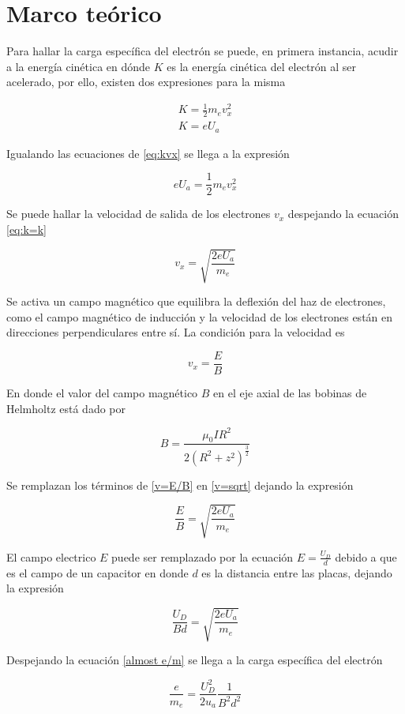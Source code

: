 \section{Marco teórico}

Para hallar la carga específica del electrón se puede, en primera instancia, acudir a la energía cinética  en dónde $K$ es la energía cinética del electrón al ser acelerado, por ello, existen dos expresiones para la misma

\begin{equation}\label{eq:kvx}
    \begin{split}
        K=\frac{1}{2}m_ev_x^2\\
        K=eU_a
    \end{split}
 \end{equation}

Igualando las ecuaciones de \ref{eq:kvx} se llega a la expresión

\begin{equation}\label{eq:k=k}
    eU_a=\frac{1}{2}m_ev_x^2
\end{equation}

Se puede hallar la velocidad de salida de los electrones $v_x$ despejando la ecuación \ref{eq:k=k}

\begin{equation}\label{v=sqrt}
    v_x=\sqrt{\frac{2eU_a}{m_e}}
\end{equation}

Se activa un campo magnético que equilibra la deflexión del haz de electrones, como el campo magnético de inducción  y la velocidad de los electrones están en direcciones perpendiculares entre sí. La condición para la velocidad es 

\begin{equation}\label{v=E/B}
    v_x=\frac{E}{B}
\end{equation}

En donde el valor del campo magnético $B$ en el eje axial  de las bobinas de Helmholtz está dado por \cite{papadopoulos-1963}

\begin{equation}
    B=\frac{\mu_0IR^2}{2(R^2+z^2)^{\frac{3}{2}}}
\end{equation}


Se remplazan los términos de \ref{v=E/B} en \ref{v=sqrt} dejando la expresión

\begin{equation}
    \frac{E}{B}=\sqrt{\frac{2eU_a}{m_e}}
\end{equation}

El campo electrico $E$ puede ser remplazado por la ecuación $E=\frac{U_D}{d}$ debido a que es el campo de un capacitor en donde $d$ es la distancia entre las placas, dejando la expresión

\begin{equation}\label{almost e/m}
    \frac{U_D}{Bd}=\sqrt{\frac{2eU_a}{m_e}}
\end{equation}

Despejando la ecuación \ref{almost e/m} se llega a la carga específica del electrón

\begin{equation}
    \frac{e}{m_e}=\frac{U_D^2}{2u_a}\frac{1}{B^2d^2}
\end{equation}
